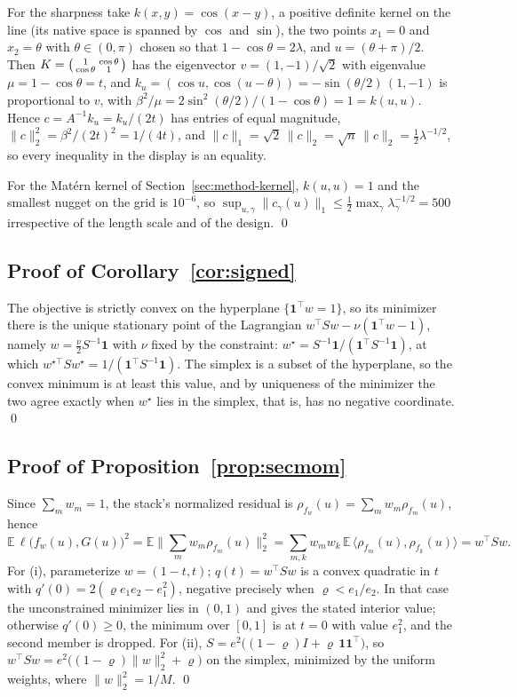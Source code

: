 For the sharpness take $k(x,y)=\cos(x-y)$, a positive definite kernel on
the line (its native space is spanned by $\cos$ and $\sin$), the two points
$x_1=0$ and $x_2=\theta$ with $\theta\in(0,\pi)$ chosen so that
$1-\cos\theta=2\lambda$, and $u=(\theta+\pi)/2$. Then
$K=\begin{psmallmatrix}1&\cos\theta\\ \cos\theta&1\end{psmallmatrix}$ has
the eigenvector $v=(1,-1)/\sqrt2$ with eigenvalue $\mu=1-\cos\theta=t$, and
$k_u=(\cos u,\cos(u-\theta))=-\sin(\theta/2)\,(1,-1)$ is proportional to
$v$, with $\beta^2/\mu=2\sin^2(\theta/2)/(1-\cos\theta)=1=k(u,u)$. Hence
$c=A^{-1}k_u=k_u/(2t)$ has entries of equal magnitude,
$\|c\|_2^2=\beta^2/(2t)^2=1/(4t)$, and
$\|c\|_1=\sqrt2\,\|c\|_2=\sqrt n\,\|c\|_2=\tfrac12\lambda^{-1/2}$, so every
inequality in the display is an equality.

For the Mat\'ern kernel of Section~\ref{sec:method-kernel}, $k(u,u)=1$ and
the smallest nugget on the grid is $10^{-6}$, so
$\sup_{u,\gamma}\|c_\gamma(u)\|_1\le\tfrac12\max_\gamma\lambda_\gamma^{-1/2}=500$
irrespective of the length scale and of the design. \qed

\subsection{Proof of Corollary~\ref{cor:signed}}
\label{proof:cor:signed}

The objective is strictly convex on the hyperplane $\{\mathbf 1^\top w=1\}$,
so its minimizer there is the unique stationary point of the Lagrangian
$w^\top Sw-\nu(\mathbf 1^\top w-1)$, namely $w=\tfrac{\nu}{2}S^{-1}\mathbf 1$
with $\nu$ fixed by the constraint: $w^\star=S^{-1}\mathbf 1/(\mathbf
1^\top S^{-1}\mathbf 1)$, at which $w^{\star\top}Sw^\star=1/(\mathbf 1^\top
S^{-1}\mathbf 1)$. The simplex is a subset of the hyperplane, so the convex
minimum is at least this value, and by uniqueness of the minimizer the two
agree exactly when $w^\star$ lies in the simplex, that is, has no negative
coordinate. \qed

\subsection{Proof of Proposition~\ref{prop:secmom}}
\label{proof:prop:secmom}

Since $\sum_m w_m=1$, the stack's normalized residual is
$\rho_{f_w}(u)=\sum_m w_m\rho_{f_m}(u)$, hence
\[
\mathbb E\,\ell\big(f_w(u),G(u)\big)^2
=\mathbb E\Big\|\sum_m w_m\rho_{f_m}(u)\Big\|_2^2
=\sum_{m,k}w_mw_k\,\mathbb E\,\langle\rho_{f_m}(u),\rho_{f_k}(u)\rangle
=w^\top Sw .
\]
For (i), parameterize $w=(1-t,t)$; $q(t)=w^\top Sw$ is a convex quadratic in
$t$ with $q'(0)=2(\varrho e_1e_2-e_1^2)$, negative precisely when
$\varrho<e_1/e_2$. In that case the unconstrained minimizer lies in $(0,1)$ and
gives the stated interior value; otherwise $q'(0)\ge0$, the minimum over
$[0,1]$ is at $t=0$ with value $e_1^2$, and the second member is dropped. For
(ii), $S=e^2\big((1-\varrho)I+\varrho\,\mathbf1\mathbf1^\top\big)$, so
$w^\top Sw=e^2\big((1-\varrho)\|w\|_2^2+\varrho\big)$ on the simplex, minimized
by the uniform weights, where $\|w\|_2^2=1/M$. \qed

